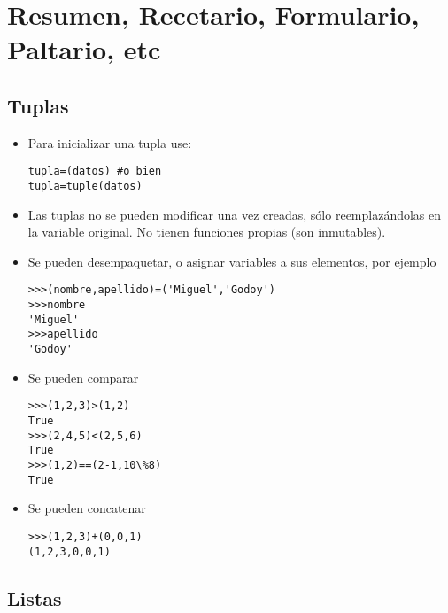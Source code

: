 \section*{Resumen, Recetario, Formulario, Paltario, etc}

\subsection*{Tuplas}

\begin{itemize}
    \item Para inicializar una tupla use:
\begin{lstlisting}[style=consola]
tupla=(datos) #o bien
tupla=tuple(datos)
\end{lstlisting}
    \item Las tuplas no se pueden modificar una vez creadas, sólo reemplazándolas en la variable original. No tienen funciones propias (son inmutables).
    \item Se pueden desempaquetar, o asignar variables a sus elementos, por ejemplo
\begin{lstlisting}[style=consola]
>>>(nombre,apellido)=('Miguel','Godoy')
>>>nombre
'Miguel'
>>>apellido
'Godoy'
\end{lstlisting}
    \item Se pueden comparar
\begin{lstlisting}[style=consola]
>>>(1,2,3)>(1,2)
True
>>>(2,4,5)<(2,5,6)
True
>>>(1,2)==(2-1,10\%8)
True    
\end{lstlisting}
    \item Se pueden concatenar
\begin{lstlisting}[style=consola]
>>>(1,2,3)+(0,0,1)
(1,2,3,0,0,1)
\end{lstlisting}
\end{itemize}

\subsection*{Listas}

